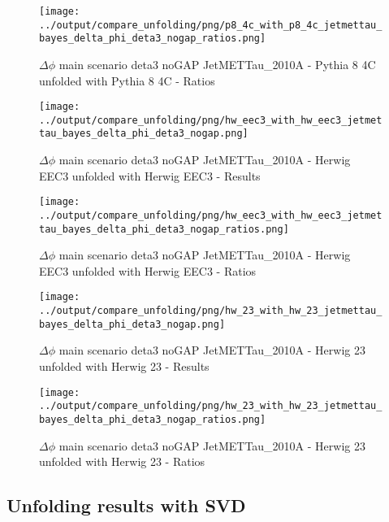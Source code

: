\documentclass[11pt]{book}
\begin{document}
\begin{figure}[ht]
\centering
\texttt{[image: ../output/compare\_unfolding/png/p8\_4c\_with\_p8\_4c\_jetmettau\_bayes\_delta\_phi\_deta3\_nogap\_ratios.png]}
\caption{$\Delta\phi$ main scenario deta3 noGAP JetMETTau\_2010A - Pythia 8 4C unfolded with Pythia 8 4C - Ratios}
\label{p8_p8_jetmettau_bayes_delta_phi_deta3_nogap_b}
\end{figure}

\begin{figure}[ht]
\centering
\texttt{[image: ../output/compare\_unfolding/png/hw\_eec3\_with\_hw\_eec3\_jetmettau\_bayes\_delta\_phi\_deta3\_nogap.png]}
\caption{$\Delta\phi$ main scenario deta3 noGAP JetMETTau\_2010A - Herwig EEC3 unfolded with Herwig EEC3 - Results}
\label{hw_eec3_hw_eec3_jetmettau_bayes_delta_phi_deta3_nogap_a}
\end{figure}

\begin{figure}[ht]
\centering
\texttt{[image: ../output/compare\_unfolding/png/hw\_eec3\_with\_hw\_eec3\_jetmettau\_bayes\_delta\_phi\_deta3\_nogap\_ratios.png]}
\caption{$\Delta\phi$ main scenario deta3 noGAP JetMETTau\_2010A - Herwig EEC3 unfolded with Herwig EEC3 - Ratios}
\label{hw_eec3_hw_eec3_jetmettau_bayes_delta_phi_deta3_nogap_b}
\end{figure}

\begin{figure}[ht]
\centering
\texttt{[image: ../output/compare\_unfolding/png/hw\_23\_with\_hw\_23\_jetmettau\_bayes\_delta\_phi\_deta3\_nogap.png]}
\caption{$\Delta\phi$ main scenario deta3 noGAP JetMETTau\_2010A - Herwig 23 unfolded with Herwig 23 - Results}
\label{hw_23_hw_23_jetmettau_bayes_delta_phi_deta3_nogap_a}
\end{figure}

\begin{figure}[ht]
\centering
\texttt{[image: ../output/compare\_unfolding/png/hw\_23\_with\_hw\_23\_jetmettau\_bayes\_delta\_phi\_deta3\_nogap\_ratios.png]}
\caption{$\Delta\phi$ main scenario deta3 noGAP JetMETTau\_2010A - Herwig 23 unfolded with Herwig 23 - Ratios}
\label{hw_23_hw_23_jetmettau_bayes_delta_phi_deta3_nogap_b}
\end{figure}

\clearpage
\subsection{Unfolding results with SVD}
\end{document}
